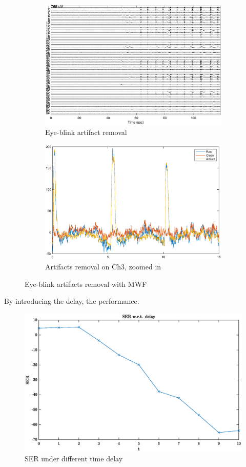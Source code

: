 \documentclass[pagesize,english,DIV=calc,footinclude=false
]{scrartcl}
\begin{document}
\begin{figure}[htbp]
  \centering
  \begin{subfigure}[b]{0.48\linewidth}
    \includegraphics[width=\linewidth]{blink_arti_rmv.eps}
    \caption{Eye-blink artifact removal}
  \end{subfigure}
  \begin{subfigure}[b]{0.48\linewidth}
    \includegraphics[width=\linewidth]{blink_arti_ch3.eps}
    \caption{Artifacts removal on Ch3, zoomed in}
  \end{subfigure}
  \caption{Eye-blink artifacts removal with MWF}
  \label{fig:blink}
\end{figure}

By introducing the delay, the performance.
\begin{figure}[htbp]
  \centering
  \includegraphics[width=0.7\linewidth]{mwf_delay_ser.eps}
  \caption{SER under different time delay}
  \label{fig:ser_delay}
\end{figure}
\end{document}

